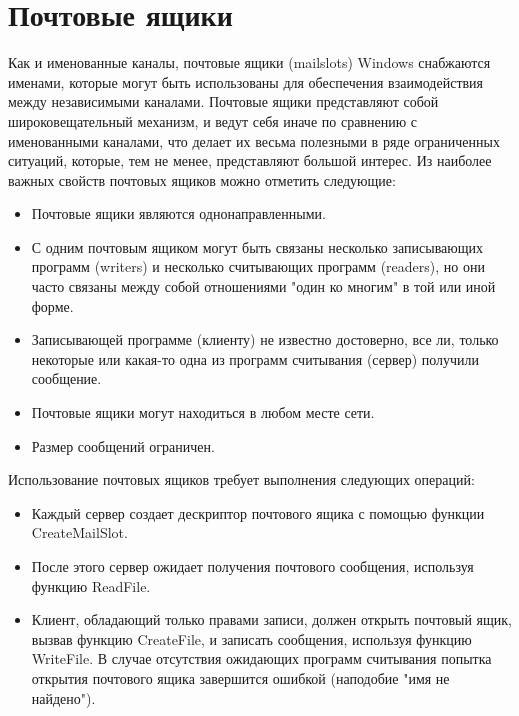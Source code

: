 \documentclass[a4paper,12pt]{article} %
\begin{document}
\newpage
\section*{Почтовые ящики}

Как и именованные каналы, почтовые ящики (mailslots) Windows снабжаются именами, которые могут быть использованы для обеспечения взаимодействия между независимыми каналами. Почтовые ящики представляют собой широковещательный механизм, и ведут себя иначе по сравнению с именованными каналами, что делает их весьма полезными в ряде ограниченных ситуаций, которые, тем не менее, представляют большой интерес. Из наиболее важных свойств почтовых ящиков можно отметить следующие:

\begin{itemize}
\item Почтовые ящики являются однонаправленными.

\item С одним почтовым ящиком могут быть связаны несколько записывающих программ (writers) и несколько считывающих программ (readers), но они часто связаны между собой отношениями "один ко многим" в той или иной форме.

\item Записывающей программе (клиенту) не известно достоверно, все ли, только некоторые или какая-то одна из программ считывания (сервер) получили сообщение.

\item Почтовые ящики могут находиться в любом месте сети.

\item Размер сообщений ограничен.
\end{itemize}

Использование почтовых ящиков требует выполнения следующих операций:
\begin{itemize}
\item Каждый сервер создает дескриптор почтового ящика с помощью функции CreateMailSlot.

\item После этого сервер ожидает получения почтового сообщения, используя функцию ReadFile.

\item Клиент, обладающий только правами записи, должен открыть почтовый ящик, вызвав функцию CreateFile, и записать сообщения, используя функцию WriteFile. В случае отсутствия ожидающих программ считывания попытка открытия почтового ящика завершится ошибкой (наподобие "имя не найдено").
\end{itemize}
\end{document}
